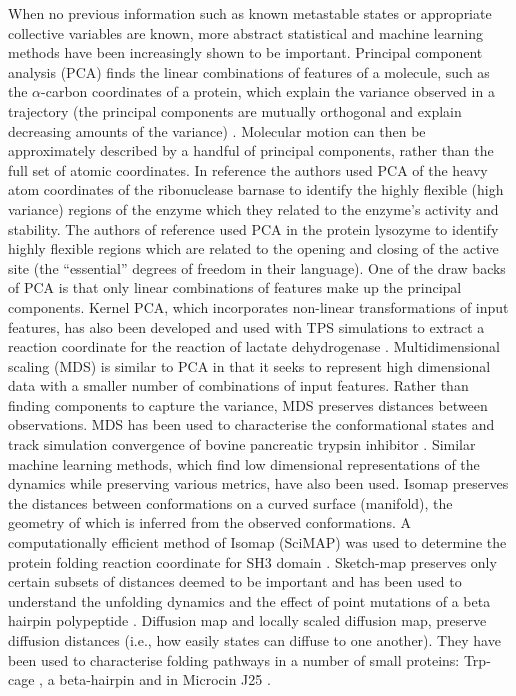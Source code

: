 When no previous information such as known metastable states or appropriate collective variables are known, more abstract statistical and machine learning methods have been increasingly shown to be important. Principal component analysis (PCA) finds the linear combinations of features of a molecule, such as the $\alpha$-carbon coordinates of a protein, which explain the variance observed in a trajectory (the principal components are mutually orthogonal and explain decreasing amounts of the variance) \cite{pearson1901liii}. Molecular motion can then be approximately described by a handful of principal components, rather than the full set of atomic coordinates. In reference \cite{noldeEssentialDomainMotions2002} the authors used PCA of the heavy atom coordinates of the ribonuclease barnase  to identify the highly flexible (high variance) regions of the enzyme which they related to the enzyme's  activity and stability. The authors of reference \cite{amadeiEssentialDynamicsProteins1993a} used PCA in the  protein lysozyme to identify highly flexible  regions which are related to the opening and closing of the active site (the ``essential'' degrees of freedom in their language).  One of the draw backs of PCA is that only linear combinations of features make up the principal components.  Kernel PCA, which incorporates non-linear transformations of input features, has also been developed and used with TPS simulations to extract a reaction coordinate for the reaction of lactate  dehydrogenase \cite{antoniouIdentificationReactionCoordinate2011,quaytmanReactionCoordinateEnzymatic2007}. Multidimensional scaling (MDS) \cite{borg1997modern} is similar to PCA in that it seeks to represent high dimensional data with a smaller number of  combinations of input features. Rather than finding components to capture the variance, MDS preserves distances between observations.  MDS has been used to characterise the conformational states and track simulation convergence of bovine pancreatic trypsin inhibitor \cite{troyerProteinConformationalLandscapes1995}. Similar machine learning methods, which find low dimensional representations of the dynamics while preserving various metrics, have also been used.  Isomap \cite{tenenbaumGlobalGeometricFramework2000} preserves the distances between conformations on a curved surface (manifold), the geometry of which is inferred from the observed conformations. A computationally efficient method of Isomap (SciMAP)  was used to determine the protein folding reaction coordinate for SH3 domain \cite{dasLowdimensionalFreeenergyLandscapes2006}. Sketch-map \cite{ceriottiSimplifyingRepresentationComplex2011} preserves only certain subsets of distances deemed to be important and has been used to understand the unfolding dynamics and the effect of point mutations of a beta hairpin polypeptide \cite{ardevolProbingUnfoldedConfigurations2015}. 
Diffusion map \cite{fergusonNonlinearDimensionalityReduction2011} and locally scaled diffusion map, preserve diffusion distances (i.e., how easily states can diffuse to one another). They have been used to characterise folding pathways in a number of small proteins:  Trp-cage \cite{kimSystematicCharacterizationProtein2015}, a beta-hairpin \cite{zhengDelineationFoldingPathways2011} and in Microcin J25 \cite{fergusonNonlinearDimensionalityReduction2011}. 

